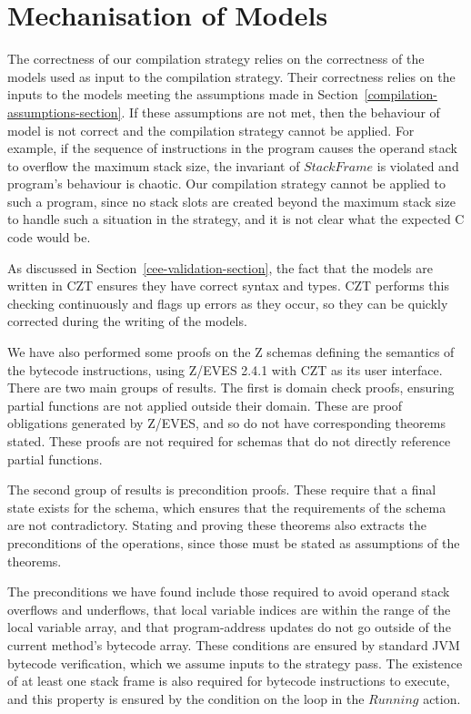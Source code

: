 \section{Mechanisation of Models}
\label{mechanisation-of-models-section}

The correctness of our compilation strategy relies on the correctness
of the models used as input to the compilation strategy.
Their correctness relies on the inputs to the models meeting the
assumptions made in Section~\ref{compilation-assumptions-section}.
If these assumptions are not met, then the behaviour of model is not
correct and the compilation strategy cannot be applied.
For example, if the sequence of instructions in the program causes the
operand stack to overflow the maximum stack size, the invariant of
$StackFrame$ is violated and program's behaviour is chaotic.
Our compilation strategy cannot be applied to such a program, since no
stack slots are created beyond the maximum stack size to handle such a
situation in the strategy, and it is not clear what the expected C
code would be.

As discussed in Section~\ref{cee-validation-section}, the fact that
the models are written in CZT ensures they have correct syntax and
types.
CZT performs this checking continuously and flags up errors as they
occur, so they can be quickly corrected during the writing of the
models.

We have also performed some proofs on the Z schemas defining the
semantics of the bytecode instructions, using Z/EVES 2.4.1 with CZT as
its user interface.
There are two main groups of results.
The first is domain check proofs, ensuring partial functions are
not applied outside their domain.
These are proof obligations generated by Z/EVES, and so do not have
corresponding theorems stated.
These proofs are not required for schemas that do not directly
reference partial functions.

The second group of results is precondition proofs.
These require that a final state exists for the schema, which ensures
that the requirements of the schema are not contradictory.
Stating and proving these theorems also extracts the preconditions of
the operations, since those must be stated as assumptions of the
theorems.

The preconditions we have found include those required to avoid
operand stack overflows and underflows, that local variable indices
are within the range of the local variable array, and that
program-address updates do not go outside of the current method's
bytecode array.
These conditions are ensured by standard JVM bytecode verification,
which we assume inputs to the strategy pass.
The existence of at least one stack frame is also required for
bytecode instructions to execute, and this property is ensured by the
condition on the loop in the $Running$ action.

